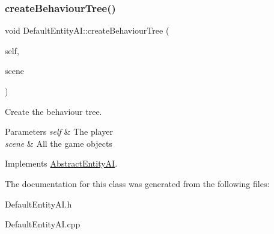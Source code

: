 \subsubsection{\texorpdfstring{create\+Behaviour\+Tree()}{createBehaviourTree()}}
{\footnotesize\ttfamily void Default\+Entity\+A\+I\+::create\+Behaviour\+Tree (\begin{DoxyParamCaption}\item[{shared\+\_\+ptr$<$ \mbox{\hyperlink{class_game_object}{Game\+Object}} $>$}]{self,  }\item[{shared\+\_\+ptr$<$ vector$<$ \mbox{\hyperlink{class_game_object}{Game\+Object}} $>$$>$}]{scene }\end{DoxyParamCaption})\hspace{0.3cm}{\ttfamily [virtual]}}



Create the behaviour tree. 


\begin{DoxyParams}{Parameters}
{\em self} & The player\\
\hline
{\em scene} & All the game objects\\
\hline
\end{DoxyParams}


Implements \mbox{\hyperlink{class_abstract_entity_a_i_a8dd5f0ed0b97b8089b1e0a7e67754bff}{Abstract\+Entity\+AI}}.



The documentation for this class was generated from the following files\+:\begin{DoxyCompactItemize}
\item 
Default\+Entity\+A\+I.\+h\item 
Default\+Entity\+A\+I.\+cpp\end{DoxyCompactItemize}

